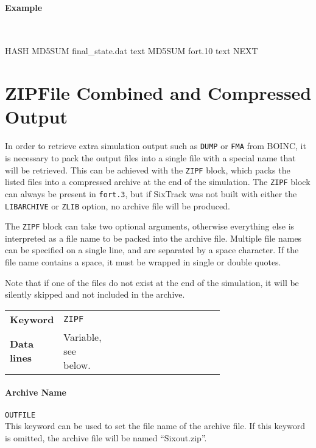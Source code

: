 \paragraph{Example}~
\begin{cverbatim}
HASH
  MD5SUM final_state.dat text
  MD5SUM fort.10         text
NEXT
\end{cverbatim}

\section{ZIPFile Combined and Compressed Output} \label{sec:ZIPF}

In order to retrieve extra simulation output such as \texttt{DUMP} or \texttt{FMA} from BOINC, it is necessary to pack the output files into a single file with a special name that will be retrieved.
This can be achieved with the \texttt{ZIPF} block, which packs the listed files into a compressed archive at the end of the simulation.
The \texttt{ZIPF} block can always be present in \texttt{fort.3}, but if SixTrack was not built with either the \texttt{LIBARCHIVE} or \texttt{ZLIB} option, no archive file will be produced.

The \texttt{ZIPF} block can take two optional arguments, otherwise everything else is interpreted as a file name to be packed into the archive file.
Multiple file names can be specified on a single line, and are separated by a space character.
If the file name contains a space, it must be wrapped in single or double quotes.

Note that if one of the files do not exist at the end of the simulation, it will be silently skipped and not included in the archive.

\bigskip
\begin{tabular}{@{}llp{0.7\linewidth}}
    \textbf{Keyword}    & \texttt{ZIPF} \\
    \textbf{Data lines} & Variable, see below. \\
\end{tabular}

\paragraph{Archive Name} \texttt{OUTFILE}\\

This keyword can be used to set the file name of the archive file.
If this keyword is omitted, the archive file will be named ``Sixout.zip''.

